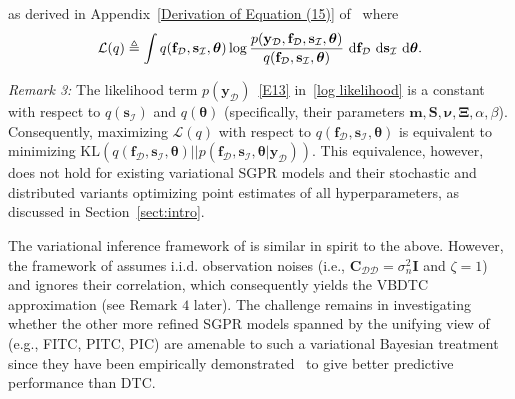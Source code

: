 \documentclass[conference]{IEEEtran}
\begin{document}
as derived in Appendix~\ref{Derivation of Equation (15)} of~\cite{HaibinAPP} where\vspace{-0.6mm} 
\begin{equation}
\hspace{-0mm}\mathcal{L}(q) \triangleq\hspace{-0mm} \int \hspace{-0mm}q(\mathbf{f}_\mathcal{D},\mathbf{s}_\mathcal{I},\boldsymbol{\theta})\log\frac{p(\mathbf{y}_\mathcal{D},\mathbf{f}_\mathcal{D},\mathbf{s}_\mathcal{I},\boldsymbol{\theta})}{q(\mathbf{f}_\mathcal{D},\mathbf{s}_\mathcal{I},\boldsymbol{\theta})}\ \mathrm{d}\mathbf{f}_\mathcal{D}\ \mathrm{d}\mathbf{s}_\mathcal{I}\ \mathrm{d}\boldsymbol{\theta}.\vspace{-0.6mm}
\end{equation}

\emph{Remark 3:} The likelihood term $p(\mathbf{y}_{\mathcal{D}})$~\eqref{E13} in~\eqref{log likelihood} is a constant with respect to $q(\mathbf{s}_\mathcal{I})$ and $q(\boldsymbol{\theta})$ (specifically, their parameters $\mathbf{m},\mathbf{S},\boldsymbol{\nu},\mathbf{\Xi},\alpha, \beta$). Consequently, maximizing $\mathcal{L}(q)$ with respect to $q(\mathbf{f}_\mathcal{D},\mathbf{s}_\mathcal{I},\boldsymbol{\theta})$ is equivalent to minimizing $\mathrm{KL}(q(\mathbf{f}_\mathcal{D},\mathbf{s}_\mathcal{I},\boldsymbol{\theta})|| p(\mathbf{f}_\mathcal{D},\mathbf{s}_\mathcal{I},\boldsymbol{\theta}|\mathbf{y}_\mathcal{D}))$. This equivalence, however, does not hold for existing variational SGPR models and their stochastic and distributed variants optimizing point estimates of all hyperparameters, as discussed in Section~\ref{sect:intro}.\vspace{1mm}

The variational inference framework of \cite{Titsias13} is similar in spirit to the above. However, the framework of \cite{Titsias13} assumes i.i.d. observation noises (i.e., $\mathbf{C}_{\mathcal{DD}} = \sigma_n^2\mathbf{I}$ and $\zeta = 1$) and ignores their correlation, 
which consequently yields the VBDTC approximation (see Remark $4$ later).
The challenge remains in investigating whether the other more refined SGPR models spanned by the unifying view of~\cite{candela05} (e.g., FITC, PITC, PIC) are amenable to such a variational Bayesian treatment since they have been empirically demonstrated~\cite{NghiaICML15,HoangICML16} to give better predictive performance than DTC.
%	
% 
\end{document}
